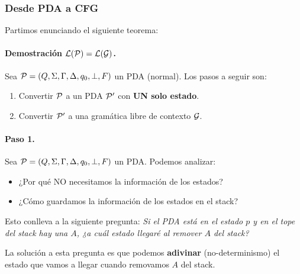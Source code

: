 \subsubsection{Desde PDA a CFG}
Partimos enunciando el siguiente teorema:
\paragraph{Demostración $\mathcal{L}(\mathcal{P}) = \mathcal{L}(\mathcal{G})$.} Sea $\mathcal{P}=(Q,\Sigma,\Gamma,\Delta,q_0,\bot,F)$ un PDA (normal). Los pasos a seguir son:
\begin{enumerate}
    \item Convertir $\mathcal{P}$ a un PDA $\mathcal{P}'$ con \textbf{UN solo estado}.
    \item Convertir $\mathcal{P}'$ a una gramática libre de contexto $\mathcal{G}$.
\end{enumerate}

\paragraph{Paso 1.} Sea $\mathcal{P}=(Q,\Sigma,\Gamma,\Delta,q_0,\bot,F)$ un PDA. Podemos analizar:
\begin{itemize}
    \item ¿Por qué NO necesitamos la información de los estados?
    \item ¿Cómo guardamos la información de los estados en el stack?
\end{itemize}

Esto conlleva a la siguiente pregunta: \textit{Si el PDA está en el estado $p$ y en el tope del stack hay una $A$, ¿a cuál estado llegaré al remover $A$ del stack?} \medbreak

La solución a esta pregunta es que podemos \textbf{adivinar} (no-determinismo) el estado que vamos a llegar cuando removamos $A$ del stack. \medbreak

